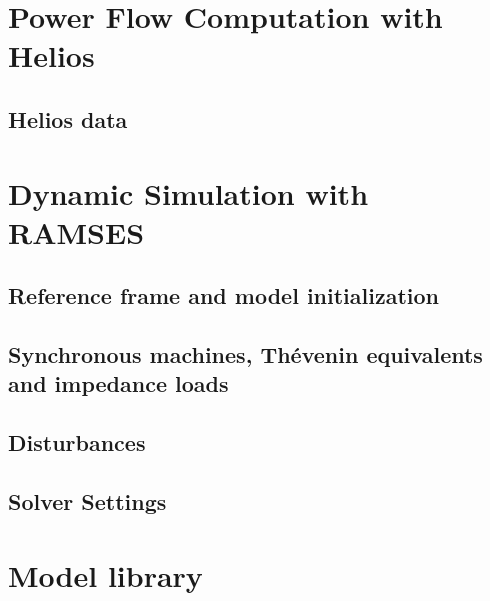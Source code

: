 \documentclass{sps-report}
\begin{document}




\part{Power Flow Computation with Helios}

\chapter{Helios data}\label{ch-pf}


\part{Dynamic Simulation with RAMSES}

\chapter{Reference frame and model initialization}\label{ch-refinit}


\chapter[Synchronous machines and loads]{Synchronous machines, Th\'{e}venin equivalents and impedance loads}\label{ch-sync}


\chapter{Disturbances}\label{ch-disturb}


\chapter{Solver Settings}\label{ch-settings}








\part{Model library}
\end{document}
